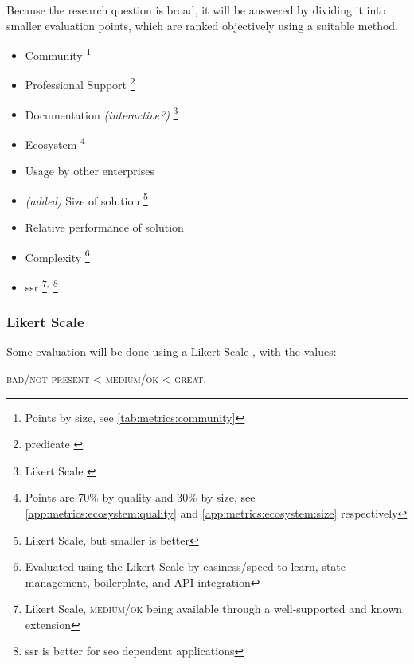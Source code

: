 Because the research question is broad, it will be answered by dividing it into smaller evaluation points, which are ranked objectively using a suitable method.

\begin{itemize}
    \item Community \footnote{Points by size, see \ref{tab:metrics:community}}
    \item Professional Support \footnote{\Gls{predicate} \label{fn:predicate}}
    \item Documentation \textit{(interactive?)} \footnote{Likert Scale \label{fn:likert_scale}}
    \item Ecosystem \footnote{Points are 70\% by quality and 30\% by size, see \ref{app:metrics:ecosystem:quality} and \ref{app:metrics:ecosystem:size} respectively}
    \item Usage by other enterprises 
    \item \textit{(added)} Size of solution \footnote{Likert Scale, but smaller is better}
    \item Relative performance of solution 
    \item Complexity \footnote{Evaluated using the Likert Scale by easiness/speed to learn, state management, boilerplate, and API integration}
    \item \acrfull{ssr} \footnote{Likert Scale, \textsc{medium/ok} being available through a well-supported and known extension}$^,$ \footnote{\acrshort{ssr} is better for \acrshort{seo} dependent applications}
\end{itemize}

\subsubsection{Likert Scale}

Some evaluation will be done using a Likert Scale \cite{enwiki:likert_scale}, with the values:

\begin{center}
    \textsc{bad/not present} < \textsc{medium/ok} < \textsc{great}.
\end{center}
